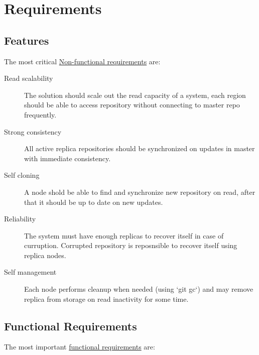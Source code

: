 \documentclass[12pt,oneside]{article}
\begin{document}
\section{Requirements}
\label{sec:requirements}

\subsection{Features}
\label{sec:features}

The most critical
\href{https://en.wikipedia.org/wiki/Non-functional_requirement}{Non-functional requirements}
are:

\begin{description}
  \item[Read scalability]
    The solution should scale out the read capacity of a system, each region should be able
    to access repository without connecting to master repo frequently.
  \item[Strong consistency]
    All active replica repositories should be synchronized on updates in master
    with immediate consistency.
  \item[Self cloning]
    A node shold be able to find and synchronize new repository on read,
    after that it should be up to date on new updates.
  \item[Reliability]
    The system must have enough replicas to recover itself in case of curruption.
    Corrupted repository is reposnsible to recover itself using replica nodes.
  \item[Self management]
    Each node performs cleanup when needed (using `git gc`) and may remove replica
    from storage on read inactivity for some time.
\end{description}

\subsection{Functional Requirements}
\label{sec:nfr}

The most important \href{https://en.wikipedia.org/wiki/Functional_requirement}{functional requirements} are:
\end{document}
